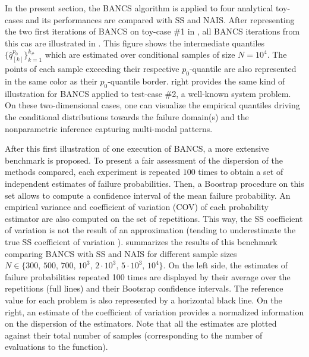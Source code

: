 In the present section, the BANCS algorithm is applied to four analytical toy-cases and its performances are compared with SS and NAIS. 
After representing the two first iterations of BANCS on toy-case \#1 in , all BANCS iterations from this cas are illustrated in . 
This figure shows the intermediate quantiles $\{\widehat{q}_{[k]}^{p_0}\}_{k=1}^{k_\#}$ which are estimated over conditional samples of size $N=10^4$. 
The points of each sample exceeding their respective $p_0$-quantile are also represented in the same color as their $p_0$-quantile border. 
 right provides the same kind of illustration for BANCS applied to test-case \#2, a well-known system problem. 
On these two-dimensional cases, one can visualize the empirical quantiles driving the conditional distributions towards the failure domain(s) and the nonparametric inference capturing multi-modal patterns.  

After this first illustration of one execution of BANCS, a more extensive benchmark is proposed. 
To present a fair assessment of the dispersion of the methods compared, each experiment is repeated $100$ times to obtain a set of independent estimates of failure probabilities. 
Then, a Boostrap procedure on this set allows to compute a confidence interval of the mean failure probability. 
An empirical variance and coefficient of variation (COV) of each probability estimator are also computed on the set of repetitions. 
This way, the SS coefficient of variation is not the result of an approximation (tending to underestimate the true SS coefficient of variation \citealp{Papaioannou_PEM_2015}).
 summarizes the results of this benchmark comparing BANCS with SS and NAIS for different sample sizes $N \in \{300,\, 500,\, 700,\, 10^3,\, 2\cdot10^3,\, 5\cdot10^3,\, 10^4\}$.  
On the left side, the estimates of failure probabilities repeated 100 times are displayed by their average over the repetitions (full lines) and their Bootsrap confidence intervals. 
The reference value for each problem is also represented by a horizontal black line. 
On the right, an estimate of the coefficient of variation provides a normalized information on the dispersion of the estimators.  
Note that all the estimates are plotted against their total number of samples (corresponding to the number of evaluations to the function). 

